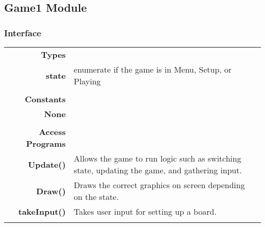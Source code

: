 \documentclass[10pt]{article}
\makeatletter
\newcommand{\CustomLabel}[1]{\Hy@raisedlink{\hypertarget{#1}{}}\label{#1}}
\makeatother
\begin{document}
        


        
        
        
        
    \subsection{Game1 Module}\CustomLabel{mis:Game1}
    \subsubsection{Interface}
        \begin{tabularx}{\linewidth}{@{} >{\bfseries}r Xp{5cm} }
            Types           & \begin{tabular}[t]{@{} l p{8cm}} 
                                     & \\
                                    state & enumerate if the game is in Menu, Setup, or Playing \\
                              \end{tabular} \\
                              
            Constants       & \begin{tabular}[t]{@{} l p{8cm}} 
                                     & \\
                                    None & \\
                              \end{tabular} \\

            Access Programs & \begin{tabular}[t]{@{} l p{8cm}}
                                     & \\
                                    Update() & Allows the game to run logic such as switching state, updating the game, and gathering input. \\
                                    Draw() & Draws the correct graphics on screen depending on the state. \\ 
                                    takeInput() & Takes user input for setting up a board. \\
                              \end{tabular}
        \end{tabularx}
        
\end{document}
